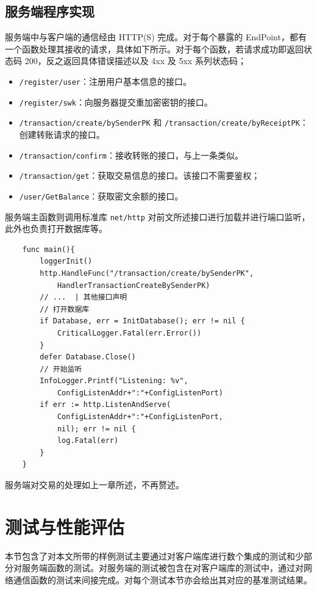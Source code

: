 \subsection{服务端程序实现}

服务端中与客户端的通信经由 HTTP(S) 完成。对于每个暴露的 EndPoint，都有一个函数处理其接收的请求，具体如下所示。对于每个函数，若请求成功即返回状态码 200，反之返回具体错误描述以及 4xx 及 5xx 系列状态码；

\begin{itemize}
    \item \verb|/register/user|：注册用户基本信息的接口。
    \item \verb|/register/swk|：向服务器提交重加密密钥的接口。
    \item \verb|/transaction/create/bySenderPK| 和 \verb|/transaction/create/byReceiptPK|：创建转账请求的接口。
    \item \verb|/transaction/confirm|：接收转账的接口，与上一条类似。
    \item \verb|/transaction/get|：获取交易信息的接口。该接口不需要鉴权；
    \item \verb|/user/GetBalance|：获取密文余额的接口。
\end{itemize}

服务端主函数则调用标准库 \texttt{net/http} 对前文所述接口进行加载并进行端口监听，此外也负责打开数据库等。

\begin{verbatim}
    func main(){
        loggerInit()
        http.HandleFunc("/transaction/create/bySenderPK", 
            HandlerTransactionCreateBySenderPK)
        // ...  | 其他接口声明
        // 打开数据库
        if Database, err = InitDatabase(); err != nil {
            CriticalLogger.Fatal(err.Error())
        }
        defer Database.Close()
        // 开始监听
        InfoLogger.Printf("Listening: %v", 
            ConfigListenAddr+":"+ConfigListenPort)
        if err := http.ListenAndServe(
            ConfigListenAddr+":"+ConfigListenPort,
            nil); err != nil {
            log.Fatal(err)
        }
    }
\end{verbatim}

服务端对交易的处理如上一章所述，不再赘述。

\section{测试与性能评估}

本节包含了对本文所带的样例测试主要通过对客户端库进行数个集成的测试和少部分对服务端函数的测试。对服务端的测试被包含在对客户端库的测试中，通过对网络通信函数的测试来间接完成。对每个测试本节亦会给出其对应的基准测试结果。

